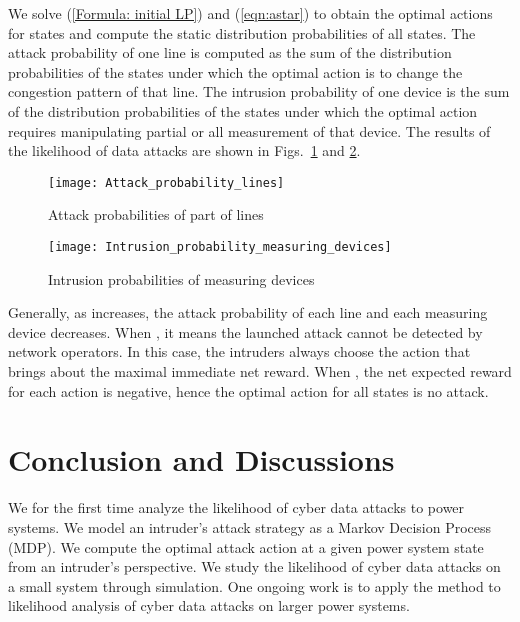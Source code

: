 \documentclass[conference,letterpaper,10pt]{IEEEtran}
\begin{document}
We solve (\ref{Formula: initial LP}) and (\ref{eqn:astar}) to obtain the optimal actions for  states and compute the static distribution probabilities of all states. The attack probability of one line is computed as the sum of the distribution probabilities of the states under which the optimal action is to change the congestion pattern of that line. The intrusion probability of one device is the sum of the distribution probabilities of the states under which the optimal action requires manipulating partial or all measurement of that device. The results of the likelihood of data attacks are shown in Figs.~\ref{fig: Attack probabilities of lines} and \ref{fig: Intrusion probabilities of devices}.

\vspace{-2mm}
\begin{figure}[h]
	\centering
	\texttt{[image: Attack\_probability\_lines]}
	\caption{Attack probabilities of part of lines } \vspace{-3mm}
	\label{fig: Attack probabilities of lines}
\end{figure}
\vspace{-3mm}
\begin{figure}[h]
	\centering
	\texttt{[image: Intrusion\_probability\_measuring\_devices]}
	\caption{Intrusion probabilities of measuring devices } \vspace{-3mm}
	\label{fig: Intrusion probabilities of devices}
\end{figure}

Generally, as  increases, the attack probability of each line and each measuring device decreases. When , it means the launched attack cannot be detected by network operators. In this case, the intruders always choose the action that brings about the maximal immediate net reward. When , the net expected reward for each action is negative, hence the optimal action for all states is no attack.  


\section{Conclusion and Discussions}\label{sec:con}
We for the first time analyze the likelihood of cyber data attacks to power systems. We model an intruder's attack strategy as a Markov Decision Process (MDP). We compute the optimal attack action at a given power system state from an intruder's perspective. We study the likelihood of cyber data attacks on a small system through simulation.
One ongoing work is to apply the method to likelihood analysis of cyber data attacks on larger power systems.
\end{document}
